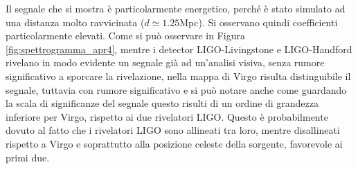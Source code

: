 Il segnale che si mostra è particolarmente energetico, perché è stato simulato ad una distanza molto ravvicinata ($d \simeq 1.25$Mpc). Si osservano quindi coefficienti particolarmente elevati.
Come si può osservare in Figura \ref{fig:spettrogramma_apr4}, mentre i detector LIGO-Livingstone e LIGO-Handford rivelano in modo evidente un segnale già ad un'analisi visiva, senza rumore significativo a sporcare la rivelazione, nella mappa di Virgo risulta distinguibile il segnale, tuttavia con rumore significativo e si può notare anche come guardando la scala di significanze del segnale questo risulti di un ordine di grandezza inferiore per Virgo, rispetto ai due rivelatori LIGO. Questo è probabilmente dovuto al fatto che i rivelatori LIGO sono allineati tra loro, mentre disallineati rispetto a Virgo e soprattutto alla posizione celeste della sorgente, favorevole ai primi due.

